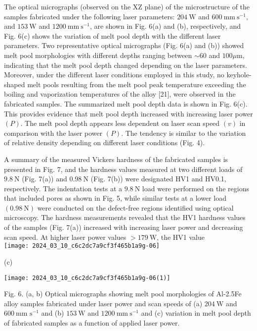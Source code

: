 \documentclass[10pt]{article}
\begin{document}
The optical micrographs (observed on the XZ plane) of the microstructure of the samples fabricated under the following laser parameters: $204 \mathrm{~W}$ and $600 \mathrm{~mm} \mathrm{~s}^{-1}$, and $153 \mathrm{~W}$ and $1200 \mathrm{~mm} \mathrm{~s}^{-1}$, are shown in Fig. 6(a) and (b), respectively, and Fig. 6(c) shows the variation of melt pool depth with the different laser parameters. Two representative optical micrographs (Fig. 6(a) and (b)) showed melt pool morphologies with different depths ranging between $\sim 60$ and $100 \mu \mathrm{m}$, indicating that the melt pool depth changed depending on the laser parameters. Moreover, under the different laser conditions employed in this study, no keyhole-shaped melt pools resulting from the melt pool peak temperature exceeding the boiling and vaporization temperatures of the alloy [21], were observed in the fabricated samples. The summarized melt pool depth data is shown in Fig. 6(c). This provides evidence that melt pool depth increased with increasing laser power $(P)$. The melt pool depth appears less dependent on laser scan speed $(v)$ in comparison with the laser power $(P)$. The tendency is similar to the variation of relative density depending on different laser conditions (Fig. 4).

A summary of the measured Vickers hardness of the fabricated samples is presented in Fig. 7, and the hardness values measured at two different loads of $9.8 \mathrm{~N}$ (Fig. 7(a)) and $0.98 \mathrm{~N}$ (Fig. 7(b)) were designated HV1 and HV0.1, respectively. The indentation tests at a $9.8 \mathrm{~N}$ load were performed on the regions that included pores as shown in Fig. 5, while similar tests at a lower load $(0.98 \mathrm{~N})$ were conducted on the defect-free regions identified using optical microscopy. The hardness measurements revealed that the HV1 hardness values of the samples (Fig. 7(a)) increased with increasing laser power and decreasing scan speed. At higher laser power values $>179 \mathrm{~W}$, the HV1 value\\
\texttt{[image: 2024\_03\_10\_c6c2dc7a9cf3f465b1a9g-06]}

(c)

\begin{center}
\texttt{[image: 2024\_03\_10\_c6c2dc7a9cf3f465b1a9g-06(1)]}
\end{center}

Fig. 6. (a, b) Optical micrographs showing melt pool morphologies of Al-2.5Fe alloy samples fabricated under laser power and scan speeds of (a) $204 \mathrm{~W}$ and $600 \mathrm{~mm}$ $\mathrm{s}^{-1}$ and (b) $153 \mathrm{~W}$ and $1200 \mathrm{~mm} \mathrm{~s}^{-1}$ and (c) variation in melt pool depth of fabricated samples as a function of applied laser power.
\end{document}
